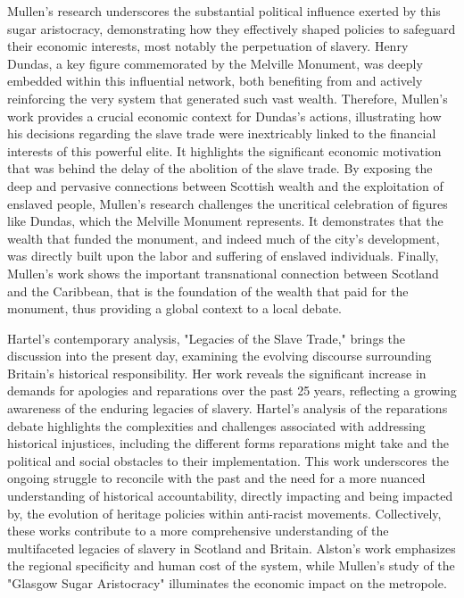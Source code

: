 \documentclass{scrartcl}
\begin{document}
Mullen's research underscores the substantial political influence exerted by this sugar aristocracy, demonstrating how they effectively shaped policies to safeguard their economic interests, most notably the perpetuation of slavery. Henry Dundas, a key figure commemorated by the Melville Monument, was deeply embedded within this influential network, both benefiting from and actively reinforcing the very system that generated such vast wealth. Therefore, Mullen's work provides a crucial economic context for Dundas's actions, illustrating how his decisions regarding the slave trade were inextricably linked to the financial interests of this powerful elite. It highlights the significant economic motivation that was behind the delay of the abolition of the slave trade.
By exposing the deep and pervasive connections between Scottish wealth and the exploitation of enslaved people, Mullen's research challenges the uncritical celebration of figures like Dundas, which the Melville Monument represents. It demonstrates that the wealth that funded the monument, and indeed much of the city's development, was directly built upon the labor and suffering of enslaved individuals. Finally, Mullen’s work shows the important transnational connection between Scotland and the Caribbean, that is the foundation of the wealth that paid for the monument, thus providing a global context to a local debate.

Hartel's contemporary analysis, "Legacies of the Slave Trade," brings the discussion into the present day, examining the evolving discourse surrounding Britain's historical responsibility.
Her work reveals the significant increase in demands for apologies and reparations over the past 25 years, reflecting a growing awareness of the enduring legacies of slavery.
Hartel's analysis of the reparations debate highlights the complexities and challenges associated with addressing historical injustices, including the different forms reparations might take and the political and social obstacles to their implementation.
This work underscores the ongoing struggle to reconcile with the past and the need for a more nuanced understanding of historical accountability, directly impacting and being impacted by, the evolution of heritage policies within anti-racist movements.
Collectively, these works contribute to a more comprehensive understanding of the multifaceted legacies of slavery in Scotland and Britain.
Alston's work emphasizes the regional specificity and human cost of the system, while Mullen's  study of the "Glasgow Sugar Aristocracy" illuminates the economic impact on the metropole.
\end{document}
